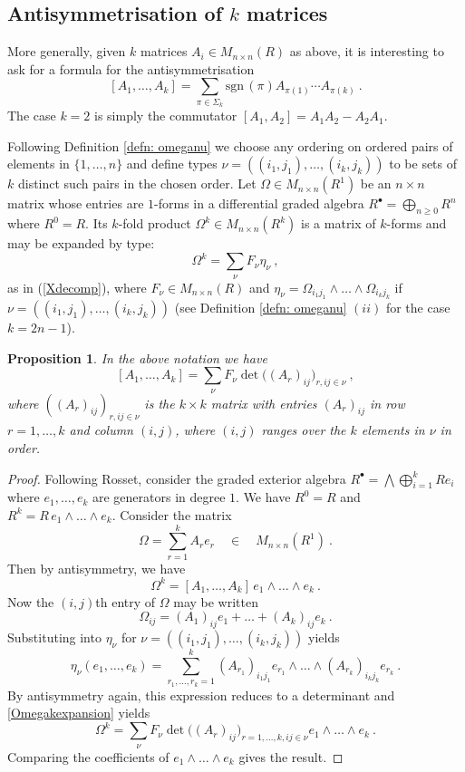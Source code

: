 \documentclass[10pt]{amsart}
\newcommand{\sgn}{\mathrm{sgn}\,}
\theoremstyle{plain}
\newtheorem{prop}[thm]{Proposition}
\newcommand{\0}{\color{blue}{\mathsf{0}}}
\begin{document}
\subsection{Antisymmetrisation of \texorpdfstring{$k$}{k} matrices} More generally, given $k$ matrices $A_i\in M_{n\times n}(R)$ as above, it is interesting to ask for a formula for the antisymmetrisation 
\[  [A_1,\ldots,A_k] =  \sum_{\pi \in \Sigma_k} \sgn(\pi) A_{\pi(1)}\cdots A_{\pi(k)} \ .  \]
The case $k=2$ is simply the commutator $[A_1,A_2]= A_1A_2-A_2A_1$.

Following Definition \ref{defn: omeganu} we choose any ordering on
ordered pairs of elements  in $\{1,\ldots,n\}$ and define types $\nu=((i_1,j_1),\ldots,(i_k,j_k))$ to be sets of $k$ distinct such pairs in the chosen order.
Let $\Omega \in M_{n\times n} (R^1)$ be an $n\times n$ matrix whose entries are $1$-forms in a differential graded algebra $R^{\bullet}= \bigoplus_{n\geq 0} R^n$ where $R^0=R$. Its  $k$-fold product  $\Omega^k\in M_{n\times n}(R^k)$  is a matrix of $k$-forms and may be expanded by type:
\begin{equation} \label{Omegakexpansion} \Omega^k=\sum_{\nu}F_\nu\eta_\nu\ , 
\end{equation}
as in  (\ref{Xdecomp}),  where $F_\nu\in M_{n\times n}(R)$ and $\eta_\nu=\Omega_{i_1j_1}\wedge\ldots\wedge\Omega_{i_kj_k}$
if $\nu=((i_1,j_1),\ldots,(i_k,j_k))$ 
(see Definition \ref{defn: omeganu} $(ii)$ for the case $k=2n-1$).
\begin{prop}\label{prop: AMk} In the above notation we have
\begin{equation}\label{eq: AMk}
[A_1,\ldots,A_k]=\sum_{\nu}F_\nu\det \Big((A_r)_{ij}\Big)_{r,ij\in\nu}\ ,
\end{equation}
where $((A_r)_{ij})_{r,ij\in\nu}$ is the $k\times k$ matrix with entries $(A_r)_{ij}$
in row  $r=1,\ldots,k$ and column $(i,j)$, where $(i,j)$ ranges over the $k$ elements in $\nu$ in order. 
\end{prop}
\begin{proof}
Following Rosset, consider the graded exterior algebra $R^{\bullet}=\bigwedge \bigoplus^k_{i=1} R e_i $ 
where $e_1,\ldots, e_k$ are generators in degree $1$. We have $R^0=R$ and $R^k =  R \, e_1\wedge \ldots \wedge e_k.$  Consider the matrix 
\[ \Omega = \sum_{r=1}^k  A_r e_r  \quad \in \quad M_{n\times n} \left( R^1\right)  \ . \]
Then by antisymmetry, we have
\[ \Omega^k=[A_1,\ldots, A_k]  \, e_1\wedge\ldots \wedge e_k\ . \]
Now the $(i,j)$th entry of $\Omega$ may be written 
\[\Omega_{ij}= (A_1)_{ij}e_1 + \ldots +(A_k)_{ij}e_k\ .\]
Substituting into $\eta_\nu$ for $\nu=((i_1,j_1),\ldots,(i_k,j_k))$ yields
\[ \eta_\nu(e_1,\ldots,e_k)=\sum_{r_1,\ldots,r_k=1}^k
(A_{r_1})_{i_1j_1}e_{r_1}\wedge\ldots\wedge(A_{r_k})_{i_kj_k}e_{r_k}\ .\]
By antisymmetry again,  this expression reduces to a determinant and  \eqref{Omegakexpansion} yields
\[ \Omega^k=\sum_{\nu}F_\nu\det \Big((A_r)_{ij}\Big)_{r=1,\ldots,k,ij\in\nu}e_1\wedge\ldots\wedge e_k\ .\]
Comparing the coefficients of $e_1\wedge\ldots\wedge e_k$ gives the result.
\end{proof}
\end{document}
